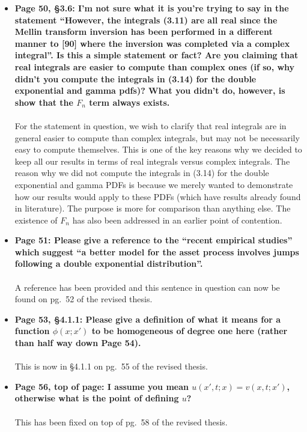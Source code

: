 \documentclass{article}
\begin{document}
\begin{enumerate}
\begin{itemize}
			\item{\textbf{Page 50, \S3.6: I'm not sure what it is you're trying to say in the statement ``However, the integrals (3.11) are all real since the Mellin transform inversion has been performed in a different manner to [90] where the inversion was completed via a complex integral''. Is this a simple statement or fact? Are you claiming that real integrals are easier to compute than complex ones (if so, why didn't you compute the integrals in (3.14) for the double exponential and gamma pdfs)? What you didn't do, however, is show that the $F_n$ term always exists.
			\\\\}}
			For the statement in question, we wish to clarify that real integrals are in general easier to compute than complex integrals, but may not be necessarily easy to compute themselves. This is one of the key reasons why we decided to keep all our results in terms of real integrals versus complex integrals. The reason why we did not compute the integrals in (3.14) for the double exponential and gamma PDFs is because we merely wanted to demonstrate how our results would apply to these PDFs (which have results already found in literature). The purpose is more for comparison than anything else. The existence of $F_n$ has also been addressed in an earlier point of contention.
			
			\item{\textbf{Page 51:  Please give a reference to the ``recent empirical studies'' which suggest ``a better model for the asset process involves jumps following a double exponential distribution''.}
			\\\\}
			A reference has been provided and this sentence in question can now be found on pg.~52 of the revised thesis.
			
			\item{\textbf{Page 53, \S4.1.1:  Please give a definition of what it means for a function $\phi(x;x')$ to be homogeneous of degree one here (rather than half way down Page 54).
			\\\\}}
			This is now in \S4.1.1 on pg.~55 of the revised thesis.
			
			\item{\textbf{Page 56, top of page:  I assume you mean $u(x',t;x) = v(x,t;x')$, otherwise what is the point of defining $u$?
			\\\\}}
			This has been fixed on top of pg.~58 of the revised thesis.
			

\end{itemize}
\end{enumerate}
\end{document}
